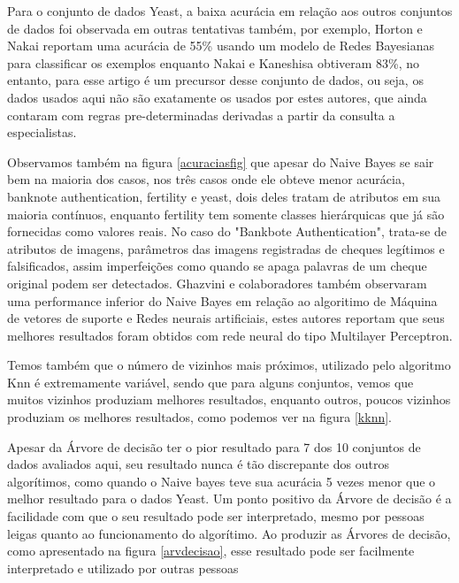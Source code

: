 \documentclass[12pt, a4paper]{article}
\begin{document}
\begin{table}[!ht]
\begin{tabular}{|l|l|l|l|}
\hline
\end{tabular}

\end{table}

Para o conjunto de dados Yeast, a baixa acurácia em relação aos outros conjuntos de dados foi observada em outras tentativas também, por exemplo, Horton e Nakai \citep{horton_kenta1996} reportam uma acurácia de 55\% usando um modelo de Redes Bayesianas para classificar os exemplos enquanto Nakai e Kaneshisa \citep{nakai_kaneshisa1991} obtiveram 83\%, no entanto, para esse artigo é um precursor desse conjunto de dados, ou seja, os dados usados aqui não são exatamente os usados por estes autores, que ainda contaram com regras pre-determinadas derivadas a partir da consulta a especialistas. 

Observamos também na figura \ref{acuraciasfig} que apesar do Naive Bayes se sair bem na maioria dos casos, nos três casos onde ele obteve menor acurácia, banknote authentication, fertility e yeast, dois deles tratam de atributos em sua maioria contínuos, enquanto fertility tem somente classes hierárquicas que já são fornecidas como valores reais. No caso do "Bankbote Authentication", trata-se de atributos de imagens, parâmetros das imagens registradas de cheques legítimos e falsificados, assim imperfeições como quando se apaga palavras de um cheque original podem ser detectados. Ghazvini e colaboradores \citep{ghazvini_etal2014} também observaram uma performance inferior do Naive Bayes em relação ao algoritimo de Máquina de vetores de suporte e Redes neurais artificiais, estes autores reportam que seus melhores resultados foram obtidos com rede neural do tipo Multilayer Perceptron.

Temos também que o número de vizinhos mais próximos, utilizado pelo algoritmo Knn é extremamente variável, sendo que para alguns conjuntos, vemos que muitos vizinhos produziam melhores resultados, enquanto outros, poucos vizinhos produziam os melhores resultados, como podemos ver na figura \ref{kknn}.

Apesar da Árvore de decisão ter o pior resultado para 7 dos 10 conjuntos de dados avaliados aqui, seu resultado nunca é tão discrepante dos outros algorítimos, como quando o Naive bayes teve sua acurácia 5 vezes menor que o melhor resultado para o dados Yeast. Um ponto positivo da Árvore de decisão é a facilidade com que o seu resultado pode ser interpretado, mesmo por pessoas leigas quanto ao funcionamento do algorítimo. Ao produzir as Árvores de decisão, como apresentado na figura \ref{arvdecisao}, esse resultado pode ser facilmente interpretado e utilizado por outras pessoas \citep{berzal_etal2003}
\end{document}
